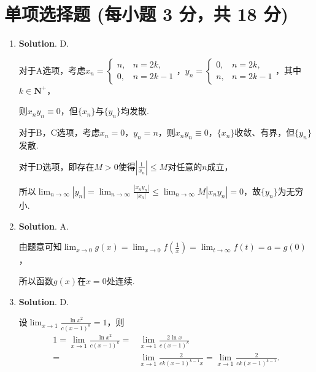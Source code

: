 \documentclass[../Main.tex]{subfiles}
\begin{document}
\section{单项选择题 (每小题 3 分，共 18 分)}
\begin{enumerate}
    \item \textbf{Solution}. D.

          对于A选项，考虑$x_{n}=
              \begin{cases}
                  n, & n=2k,  \\
                  0, & n=2k-1
              \end{cases}$，$y_{n}=
              \begin{cases}
                  0, & n=2k,  \\
                  n, & n=2k-1
              \end{cases}$，其中$k\in\mathbf{N}^{+}$，

          则$x_{n}y_{n}\equiv 0$，但$\{x_{n}\}$与$\{y_{n}\}$均发散.

          对于B，C选项，考虑$x_{n}= 0$，$y_{n}=n$，则$x_{n}y_{n}\equiv 0$，$\{x_{n}\}$收敛、有界，但$\{
              y_{n}\}$发散.

          对于D选项，即存在$M>0$使得$\left|\frac{1}{x_{n}}\right|\leq M$对任意的$n$成立，

          所以$\lim_{n\to\infty}|y_{n}| = \lim_{n\to\infty}\frac{|x_{n} y_{n}|}{|x_{n}|}
              \leq \lim_{n\to\infty}M|x_{n} y_{n}| = 0$，故$\{y_{n}\}$为无穷小.

    \item \textbf{Solution}. A.

          由题意可知$\lim_{x\to 0}g(x)=\lim_{x\to0}f\left(\frac{1}{x}\right)=\lim_{t\to\infty}
              f(t)=a=g(0)$，

          所以函数$g(x)$在$x=0$处连续.

    \item \textbf{Solution}. D.

          设$\lim_{x\to1}\frac{\ln x^{2}}{c(x-1)^{k}}=1$，则
          \[
              \begin{aligned}
                  1 = \lim_{x\to1}\frac{\ln x^2}{c(x-1)^k}= & \lim_{x\to1}\frac{2\ln x}{c(x-1)^k}                                             \\
                  =                                         & \lim_{x\to1}\frac{2}{c k (x-1)^{k-1} x}= \lim_{x\to1}\frac{2}{c k (x-1)^{k-1}}.
              \end{aligned}
          \]


\end{enumerate}
\end{document}
